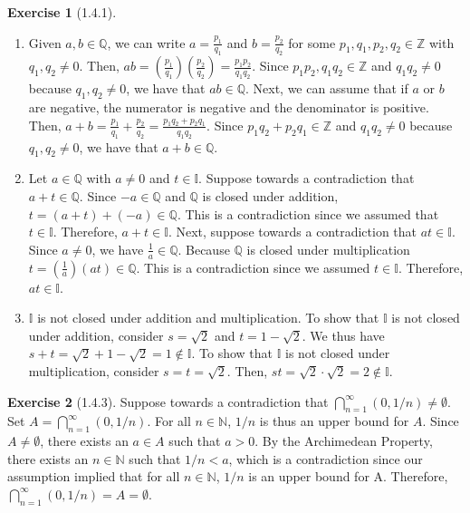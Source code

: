 \documentclass{amsart}
\theoremstyle{definition}
\newtheorem{exercise}{Exercise}
\newcommand{\N}{\mathbb{N}}
\newcommand{\Z}{\mathbb{Z}}
\newcommand{\Q}{\mathbb{Q}}
\newcommand{\I}{\mathbb{I}}
\begin{document}
\begin{exercise}[1.4.1]
  \begin{enumerate}[label={(\alph*)}]
    \item Given $a, b \in \Q$, we can write $a = \frac{p_1}{q_1}$ and $b =
      \frac{p_2}{q_2}$ for some $p_1, q_1, p_2, q_2 \in \Z$ with $q_1, q_2 \neq
      0$.  Then, $ab = (\frac{p_1}{q_1}) (\frac{p_2}{q_2}) = \frac{p_1 p_2}{q_1
      q_2}$. Since $p_1 p_2, q_1 q_2 \in \Z$ and $q_1 q_2 \neq 0$ because $q_1,
      q_2 \neq 0$, we have that $ab \in \Q$. Next, we can assume that if $a$ or
      $b$ are negative, the numerator is negative and the denominator is
      positive. Then, $a + b = \frac{p_1}{q_1} + \frac{p_2}{q_2} = \frac{p_1 q_2
      + p_2 q_1}{q_1 q_2}$.  Since $p_1 q_2 + p_2 q_1 \in \Z$ and $q_1  q_2 \neq
      0$ because $q_1, q_2 \neq 0$, we have that $a + b \in \Q$.
    \item Let $a \in \Q$ with $a \neq 0$ and $t \in \I$. Suppose towards a
      contradiction that $a + t \in \Q$. Since $-a \in \Q$ and $\Q$ is closed
      under addition, $t = (a + t) + (-a) \in \Q$. This is a contradiction since
      we assumed that $t \in \I$. Therefore, $a + t \in \I$. Next, suppose
      towards a contradiction that $at \in \I$. Since $a \neq 0$, we have
      $\frac{1}{a} \in \Q$. Because $\Q$ is closed under multiplication $t =
      (\frac{1}{a}) (at) \in \Q$. This is a contradiction since we assumed $t
      \in \I$. Therefore, $at \in \I$.
    \item $\I$ is not closed under addition and multiplication. To show that
      $\I$ is not closed under addition, consider $s = \sqrt{2}$ and $t = 1 -
      \sqrt{2}$. We thus have $s + t = \sqrt{2} + 1 - \sqrt{2} = 1 \notin \I$.
      To show that $\I$ is not closed under multiplication, consider $s =
      t = \sqrt{2}$. Then, $st = \sqrt{2} \cdot \sqrt{2} = 2 \notin \I$.
  \end{enumerate}
\end{exercise}

\begin{exercise}[1.4.3]
  Suppose towards a contradiction that $\bigcap_{n=1}^{\infty} (0, 1/n) \neq
  \emptyset$. Set $A = \bigcap_{n=1}^{\infty} (0, 1/n)$. For all $n \in \N$,
  $1/n$ is thus an upper bound for $A$. Since $A \neq \emptyset$, there exists
  an $a \in A$ such that $a > 0$. By the Archimedean Property, there exists an
  $n \in \N$ such that $1/n < a$, which is a contradiction since our assumption
  implied that for all $n \in \N$, $1/n$ is an upper bound for A. Therefore,
  $\bigcap_{n=1}^{\infty} (0, 1/n) = A = \emptyset$.
\end{exercise}
\end{document}
